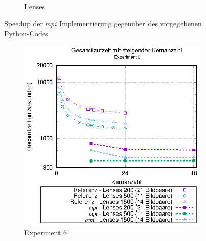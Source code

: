 \begin{center}
\begin{figure}[htbp]
\begin{subfigure}[b]{0.45\textwidth}
			\caption{Lenses}
			\label{fig:mpi_speedup_lenses}
		\end{subfigure}
		\caption{Speedup der \textit{mpi} Implementierung gegenüber des vorgegebenen Python-Codes}
		\label{fig:mpi_speedup}
	\end{figure}
\end{center}

\begin{center}
	\begin{figure}[htbp]
		\begin{subfigure}[b]{0.45\textwidth}
			\centering
			\includegraphics[width=\textwidth]{pdf/mpi_times_exp6}
			\caption{Experiment 6}
			\label{fig:mpi_times_exp6}
		\end{subfigure}
		\hfill
		\begin{subfigure}[b]{0.45\textwidth}
			\centering

\end{subfigure}
\end{figure}
\end{center}
